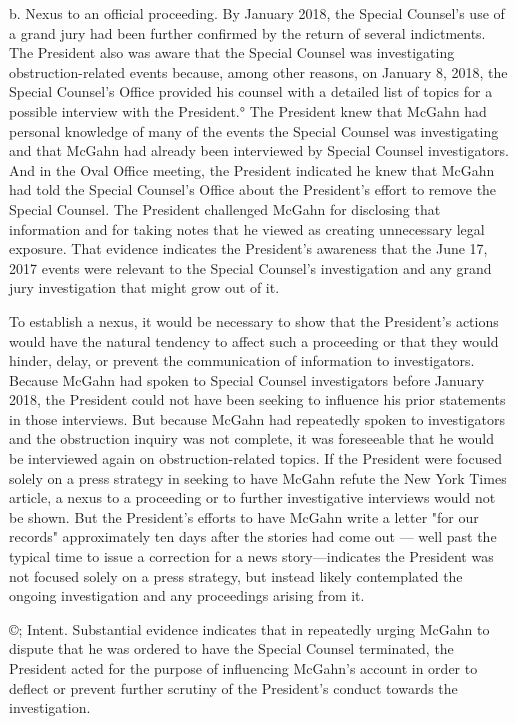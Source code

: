 b. Nexus to an official proceeding.
By January 2018, the Special Counsel's use of a grand jury had been further confirmed by the return of several indictments.
The President also was aware that the Special Counsel was investigating obstruction-related events because, among other reasons, on January 8, 2018, the Special Counsel's Office provided his counsel with a detailed list of topics for a possible interview with the President.°
The President knew that McGahn had personal knowledge of many of the events the Special Counsel was investigating and that McGahn had already been interviewed by Special Counsel investigators.
And in the Oval Office meeting, the President indicated he knew that McGahn had told the Special Counsel's Office about the President's effort to remove the Special Counsel.
The President challenged McGahn for disclosing that information and for taking notes that he viewed as creating unnecessary legal exposure.
That evidence indicates the President's awareness that the June 17, 2017 events were relevant to the Special Counsel's investigation and any grand jury investigation that might grow out of it.

To establish a nexus, it would be necessary to show that the President's actions would have the natural tendency to affect such a proceeding or that they would hinder, delay, or prevent the communication of information to investigators.
Because McGahn had spoken to Special Counsel investigators before January 2018, the President could not have been seeking to influence his prior statements in those interviews.
But because McGahn had repeatedly spoken to investigators and the obstruction inquiry was not complete, it was foreseeable that he would be interviewed again on obstruction-related topics.
If the President were focused solely on a press strategy in seeking to have McGahn refute the New York Times article, a nexus to a proceeding or to further investigative interviews would not be shown.
But the President's efforts to have McGahn write a letter "for our records" approximately ten days after the stories had come out — well past the typical time to issue a correction for a news story—indicates the President was not focused solely on a press strategy, but instead likely contemplated the ongoing investigation and any proceedings arising from it.

©; Intent.
Substantial evidence indicates that in repeatedly urging McGahn to dispute that he was ordered to have the Special Counsel terminated, the President acted for the purpose of influencing McGahn's account in order to deflect or prevent further scrutiny of the President's conduct towards the investigation.

